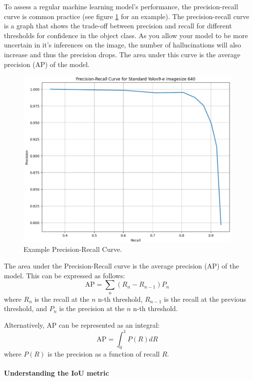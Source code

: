 To assess a regular machine learning model's performance, the precision-recall curve is common practice (see figure \ref{fig:precisionrecallcurveexample} for an example). The precision-recall curve is a graph that shows the trade-off between precision and recall for different thresholds for confidence in the object class. As you allow your model to be more uncertain in it's inferences on the image, the number of hallucinations will also increase and thus the precision drops. The area under this curve is the average precision (AP) of the model. 

\begin{figure}
    \centering
    \includegraphics[width=0.7\linewidth]{Images/Results/PR-curve standard e 640.png}
    \caption{Example Precision-Recall Curve.}
    \label{fig:precisionrecallcurveexample}
\end{figure}

The area under the Precision-Recall curve is the average precision (AP) of the model. This can be expressed as follows:
\begin{equation}
    \text{AP} = \sum_{n} (R_n - R_{n-1}) P_n
\end{equation}
where $R_n$ is the recall at the $n$ n-th threshold, $R_{n-1}$ is the recall at the previous threshold, and $P_n$ is the precision at the $n$ n-th threshold.

Alternatively, AP can be represented as an integral:
\begin{equation}
    \text{AP} = \int_{0}^{1} P(R) dR
\end{equation}
where $P(R)$ is the precision as a function of recall $R$. 


\paragraph{Understanding the IoU metric}

